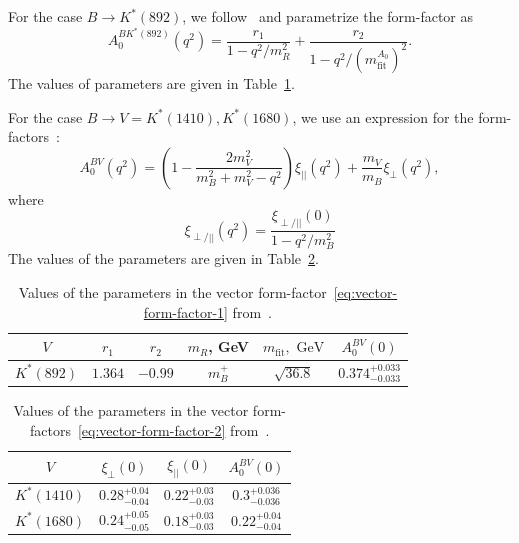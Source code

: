 \documentclass[a4paper,12pt,dvipsnames,usernames]{article}
\begin{document}
For the case $B\to K^{*}(892)$, we follow~\cite{Ball:2004rg} and parametrize the form-factor as
\begin{equation}
    A^{BK^{*}(892)}_{0}(q^{2}) = \frac{r_{1}}{1-q^{2}/m_{R}^{2}}+\frac{r_{2}}{1-q^{2}/(m_{\text{fit}}^{A_{0}})^{2}}.
    \label{eq:vector-form-factor-1}
\end{equation}
The values of parameters are given in Table~\ref{tab:vector-form-factor-parameters1}.

For the case $B\to V = K^{*}(1410), K^{*}(1680)$, we use an expression for the form-factors~\cite{Lu:2011jm,Hatanaka:2009gb}: 
\begin{equation}
     A^{BV}_{0}(q^{2}) = \left( 1-\frac{2m_{V}^{2}}{m_B^2 + m_V^2 - q^2}\right)\xi_{||}(q^{2})+\frac{m_{V}}{m_{B}}\xi_{\perp}(q^{2}),
     \label{eq:vector-form-factor-2}
\end{equation}
where 
\begin{equation}
\xi_{\perp/||}(q^{2}) = \frac{\xi_{\perp/||}(0)}{1-q^{2}/m_{B}^{2}}
\end{equation}
The values of the parameters are given in  Table~\ref{tab:vector-form-factor-parameters2}.

\begin{table}[t!]
    \centering
    \begin{tabular}{|c|c|c|c|c|c|}
        \hline  
        $V$ & $r_{1}$ & $r_{2}$ & $m_{R}$, GeV & $m_{\text{fit}}, \text{ GeV}$ & $A^{BV}_{0}(0)$ \\
        \hline
        $K^{*}(892)$ & $1.364$ & $-0.99$ & $m_{B}^{+}$ & $\sqrt{36.8}$ & $0.374^{+0.033}_{-0.033}$ \\
        \hline
    \end{tabular}
    \caption{Values of the parameters in the vector form-factor~\eqref{eq:vector-form-factor-1} from~\cite{Ball:2004rg}.}
    \label{tab:vector-form-factor-parameters1}
\end{table}

\begin{table}[t!]
    \centering
    \begin{tabular}{|c|c|c|c|}
        \hline  
        $V$ & $\xi_{\perp}(0)$ & $\xi_{||}(0)$ & $A^{BV}_{0}(0)$ \\
        \hline
        $K^{*}(1410)$ & $0.28^{+0.04}_{-0.04}$ & $0.22^{+0.03}_{-0.03}$ & $0.3^{+0.036}_{-0.036}$ \\
        \hline
        $K^{*}(1680)$ & $0.24^{+0.05}_{-0.05}$  & $0.18^{+0.03}_{-0.03}$ & $0.22^{+0.04}_{-0.04}$ \\
        \hline
    \end{tabular}
    \caption{Values of the parameters in the vector form-factors~\eqref{eq:vector-form-factor-2} from~\cite{Lu:2011jm,Hatanaka:2009gb}.}
    \label{tab:vector-form-factor-parameters2}
\end{table}
\end{document}
